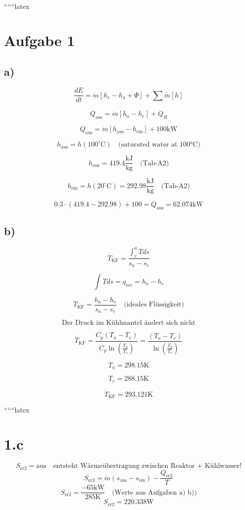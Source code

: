 
``````latex


\section*{Aufgabe 1}

\subsection*{a)}

\[
\frac{dE}{dt} = \dot{m} \left[ h_e - h_a + \Phi \right] + \sum \dot{m} \left[ h \right]
\]

\[
Q_{\text{aus}} = \dot{m} \left[ h_a - h_e \right] + \dot{Q}_R
\]

\[
Q_{\text{aus}} = \dot{m} \left[ h_{\text{aus}} - h_{\text{ein}} \right] + 100 \text{kW}
\]

\[
h_{\text{aus}} = h \left( 100^\circ \text{C} \right) \quad \text{(saturated water at 100°C)}
\]

\[
h_{\text{aus}} = 419.4 \frac{\text{kJ}}{\text{kg}} \quad \text{(Tab-A2)}
\]

\[
h_{\text{ein}} = h \left( 20^\circ \text{C} \right) = 292.98 \frac{\text{kJ}}{\text{kg}} \quad \text{(Tab-A2)}
\]

\[
0.3 \cdot \left( 419.4 - 292.98 \right) + 100 = Q_{\text{aus}} = 62.074 \text{kW}
\]

\subsection*{b)}

\[
\dot{T}_{\text{KF}} = \frac{\int_{e}^{a} T ds}{s_a - s_e}
\]

\[
\int T ds = q_{\text{rev}} = h_a - h_e
\]

\[
\dot{T}_{\text{KF}} = \frac{h_a - h_e}{s_a - s_e} \quad \text{(ideales Flüssigkeit)}
\]

\[
\text{Der Druck im Kühlmantel ändert sich nicht}
\]

\[
\dot{T}_{\text{KF}} = \frac{C_p \left( T_a - T_e \right)}{C_p \ln \left( \frac{T_a}{T_e} \right)} = \frac{\left( T_a - T_e \right)}{\ln \left( \frac{T_a}{T_e} \right)}
\]

\[
T_a = 298.15 \text{K}
\]

\[
T_e = 288.15 \text{K}
\]

\[
\dot{T}_{\text{KF}} = 293.121 \text{K}
\]

``````latex


\section*{1.c}
\[
S_{\text{er2}} = \text{aus} \quad \text{entsteht Wärmeübertragung zwischen Reaktor + Kühlwasser!}
\]
\[
S_{\text{er2}} = \dot{m} \left( s_{\text{aus}} - s_{\text{ein}} \right) - \frac{Q_{\text{er2}}}{T}
\]
\[
S_{\text{er2}} = \frac{-65 \text{kW}}{285 \text{K}} \quad \text{(Werte aus Aufgaben a) b))}
\]
\[
S_{\text{er2}} = 220.338 \text{W}
\]

